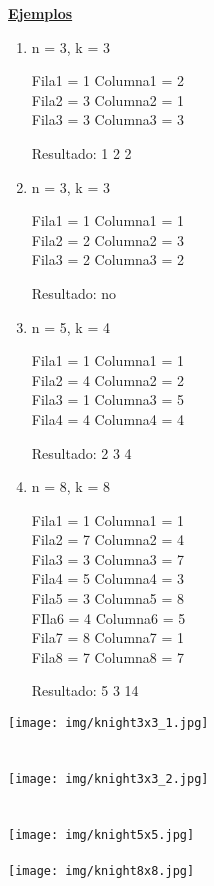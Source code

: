 \noindent \underline{\textbf{Ejemplos}}
\begin{multicols}{2}
\begin{enumerate}[leftmargin=0.5cm]
\item n = 3, k = 3

Fila1 = 1 Columna1 = 2\\
Fila2 = 3 Columna2 = 1\\
Fila3 = 3 Columna3 = 3

Resultado: 1 2 2

\item n = 3, k = 3

Fila1 = 1 Columna1 = 1\\
Fila2 = 2 Columna2 = 3\\
Fila3 = 2 Columna3 = 2

Resultado: no

\item n = 5, k = 4

Fila1 = 1 Columna1 = 1\\
Fila2 = 4 Columna2 = 2\\
Fila3 = 1 Columna3 = 5\\
Fila4 = 4 Columna4 = 4

Resultado: 2 3 4

\item n = 8, k = 8

Fila1 = 1 Columna1 = 1\\
Fila2 = 7 Columna2 = 4\\
Fila3 = 3 Columna3 = 7\\
Fila4 = 5 Columna4 = 3\\
Fila5 = 3 Columna5 = 8\\
FIla6 = 4 Columna6 = 5\\
Fila7 = 8 Columna7 = 1\\
Fila8 = 7 Columna8 = 7

Resultado: 5 3 14
\end{enumerate}

\columnbreak

\texttt{[image: img/knight3x3\_1.jpg]}\\\\\\

\texttt{[image: img/knight3x3\_2.jpg]}\\\\\\

\texttt{[image: img/knight5x5.jpg]}\\\\

\texttt{[image: img/knight8x8.jpg]}
\end{multicols}

